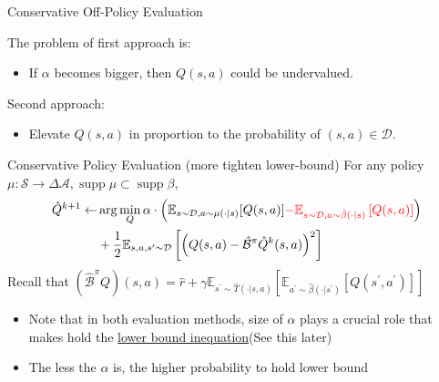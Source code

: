\documentclass[11pt]{beamer}
\newcommand{\mbb}[1]{\mathbb{#1}}
\newcommand{\mc}[1]{\mathcal{#1}}
\newcommand{\supp}{\operatorname{supp}}
\begin{document}
\begin{frame}{Conservative Off-Policy Evaluation}

  The problem of first approach is:
  \begin{itemize}
    \item If $\alpha$ becomes bigger, then $Q(s,a)$ could be undervalued.
  \end{itemize}

  Second approach:
  \begin{itemize}
    \item Elevate $Q(s,a)$ in proportion to the probability of $(s,a)\in \mc{D}$.
  \end{itemize}

  \begin{block}{Conservative Policy Evaluation (more tighten lower-bound)}
    For any policy $\mu : \mc{S} \to \Delta{\mc{A}}, \supp \mu \subset \supp \beta$,
    \[
    \begin{aligned}
          \hat{Q}^{k+1} \leftarrow &\arg \min_{Q} \alpha \cdot \left(\mbb{E}_{s \sim \mc{D}, a \sim \mu(\cdot|s)}[Q(s,a)] \textcolor{red}{- \mbb{E}_{s \sim \mc{D}, a \sim \hat{\beta}(\cdot|s)} \left[Q(s,a)\right]} \right) \\
          &+ \frac{1}{2} \mbb{E}_{s,a,s^\prime \sim \mc{D}} \left[ \left(Q(s,a) - \hat{\mc{B}}^\pi \hat{Q}^{k}(s,a)\right)^2\right]
  \end{aligned}
  \]
  Recall that $ (\hat{\mc{B}}^\pi Q)(s,a) = \hat{r} + \gamma \mbb{E}_{s^\prime \sim \hat{T}(\cdot | s,a)}\left[\mbb{E}_{a^\prime \sim \hat{\beta}(\cdot |s^\prime)} \left[ Q(s^\prime,a^\prime) \right]\right]$
  \end{block}


  \begin{itemize}
    \item Note that in both evaluation methods, size of $\alpha$ plays a crucial role that makes hold the \underline{lower bound inequation}(See this later)
    \item The less the $\alpha$ is, the higher probability to hold lower bound
  \end{itemize}
\end{frame}
\end{document}
